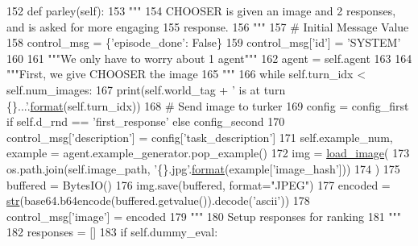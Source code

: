 \begin{DoxyCode}
152     \textcolor{keyword}{def }parley(self):
153         \textcolor{stringliteral}{"""}
154 \textcolor{stringliteral}{        CHOOSER is given an image and 2 responses, and is asked for more engaging}
155 \textcolor{stringliteral}{        response.}
156 \textcolor{stringliteral}{        """}
157         \textcolor{comment}{# Initial Message Value}
158         control\_msg = \{\textcolor{stringliteral}{'episode\_done'}: \textcolor{keyword}{False}\}
159         control\_msg[\textcolor{stringliteral}{'id'}] = \textcolor{stringliteral}{'SYSTEM'}
160 
161         \textcolor{stringliteral}{"""We only have to worry about 1 agent"""}
162         agent = self.agent
163 
164         \textcolor{stringliteral}{"""First, we give CHOOSER the image}
165 \textcolor{stringliteral}{        """}
166         \textcolor{keywordflow}{while} self.turn\_idx < self.num\_images:
167             print(self.world\_tag + \textcolor{stringliteral}{' is at turn \{\}...'}.\hyperlink{namespaceparlai_1_1chat__service_1_1services_1_1messenger_1_1shared__utils_a32e2e2022b824fbaf80c747160b52a76}{format}(self.turn\_idx))
168             \textcolor{comment}{# Send image to turker}
169             config = config\_first \textcolor{keywordflow}{if} self.d\_rnd == \textcolor{stringliteral}{'first\_response'} \textcolor{keywordflow}{else} config\_second
170             control\_msg[\textcolor{stringliteral}{'description'}] = config[\textcolor{stringliteral}{'task\_description'}]
171             self.example\_num, example = agent.example\_generator.pop\_example()
172             img = \hyperlink{namespacepersonality__captions_1_1worlds_a2863737d97a8e8c5a1ebe9029d0d2293}{load\_image}(
173                 os.path.join(self.image\_path, \textcolor{stringliteral}{'\{\}.jpg'}.\hyperlink{namespaceparlai_1_1chat__service_1_1services_1_1messenger_1_1shared__utils_a32e2e2022b824fbaf80c747160b52a76}{format}(example[\textcolor{stringliteral}{'image\_hash'}]))
174             )
175             buffered = BytesIO()
176             img.save(buffered, format=\textcolor{stringliteral}{"JPEG"})
177             encoded = \hyperlink{namespacegenerate__task__READMEs_a5b88452ffb87b78c8c85ececebafc09f}{str}(base64.b64encode(buffered.getvalue()).decode(\textcolor{stringliteral}{'ascii'}))
178             control\_msg[\textcolor{stringliteral}{'image'}] = encoded
179             \textcolor{stringliteral}{"""}
180 \textcolor{stringliteral}{                Setup responses for ranking}
181 \textcolor{stringliteral}{            """}
182             responses = []
183             \textcolor{keywordflow}{if} self.dummy\_eval:

\end{DoxyCode}
